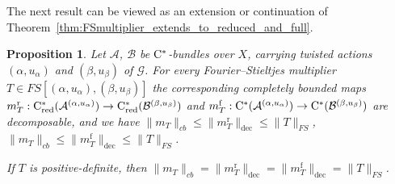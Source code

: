 \documentclass[11 pt, leqno]{amsart}
\numberwithin{equation}{section}
\theoremstyle{plain}
\newtheorem {prop}[thm] {Proposition}
\theoremstyle{definition}
\DeclareMathOperator{\red}{red}%
\DeclareMathOperator{\rd}{r}%
\DeclareMathOperator{\f}{f}%
\newcommand{\B}{\mathcal B}
\newcommand{\m}{m}
\newcommand{\G}{\mathcal G} %
\newcommand{\A}{\mathcal A}
\newcommand{\cst}{\ifmmode\mathrm{C}^*\else{$\mathrm{C}^*$}\fi}
\begin{document}
The next result can be viewed as an extension or continuation  of Theorem~\ref{thm:FSmultiplier_extends_to_reduced_and_full}. 


\begin{prop}\label{prop:FSmultipliers_decomposable}
Let $\A$, $\B$ be $\cst$-bundles over $X$, carrying twisted actions $(\alpha,u_\alpha)$ and $(\beta,u_\beta)$ of $\G$. 
For every Fourier--Stieltjes multiplier $T\in FS[(\alpha,u_{\alpha}),(\beta,u_{\beta})]$ the corresponding completely bounded maps $\m_T^{\rd} : \cst_{\red}(\A^{(\alpha,u_{\alpha})}) \to \cst_{\red}(\B^{(\beta,u_{\beta})})$ and $\m_T^{\f} : \cst(\A^{(\alpha,u_{\alpha})}) \to \cst(\B^{(\beta,u_{\beta})})$ are decomposable, and we have $\|\m_T\|_{cb} \leq \|\m_T^{\rd}\|_{\mathrm{dec}}  \leq \|T\|_{FS}$, $\|\m_T\|_{cb}\leq \|\m_T^{\f}\|_{\mathrm{dec}} \leq \|T\|_{FS}$. 

If $T$ is positive-definite, then $\|\m_T\|_{cb} = \| \m_T^{\rd} \|_{\mathrm{dec}} = \| \m_T^{\f} \|_{\mathrm{dec}} = \| T \|_{FS}$. 
\end{prop}
\end{document}

